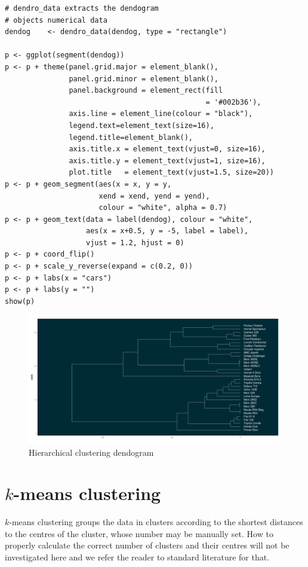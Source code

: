 \begin{verbatim}
# dendro_data extracts the dendogram 
# objects numerical data
dendog    <- dendro_data(dendog, type = "rectangle")

p <- ggplot(segment(dendog)) 
p <- p + theme(panel.grid.major = element_blank(), 
               panel.grid.minor = element_blank(),
               panel.background = element_rect(fill 
                                               = '#002b36'),
               axis.line = element_line(colour = "black"),
               legend.text=element_text(size=16),
               legend.title=element_blank(),
               axis.title.x = element_text(vjust=0, size=16),
               axis.title.y = element_text(vjust=1, size=16),
               plot.title   = element_text(vjust=1.5, size=20))
p <- p + geom_segment(aes(x = x, y = y, 
                      xend = xend, yend = yend),
                      colour = "white", alpha = 0.7)
p <- p + geom_text(data = label(dendog), colour = "white", 
                   aes(x = x+0.5, y = -5, label = label),
                   vjust = 1.2, hjust = 0)
p <- p + coord_flip()
p <- p + scale_y_reverse(expand = c(0.2, 0))
p <- p + labs(x = "cars")
p <- p + labs(y = "")
show(p)
\end{verbatim}
\begin{figure}[htbp]
 \centering
 \includegraphics[scale=0.25]{images/dendo}
 \caption*{Hierarchical clustering dendogram}
\end{figure}

\section{$k$-means clustering}
$k$-means clustering groups the data
in clusters according to the shortest
distances to the centres of the cluster,
whose number may be manually set. How to
properly calculate the correct number
of clusters and their centres will not 
be investigated here and we refer the 
reader to standard literature for that.
\bigskip

